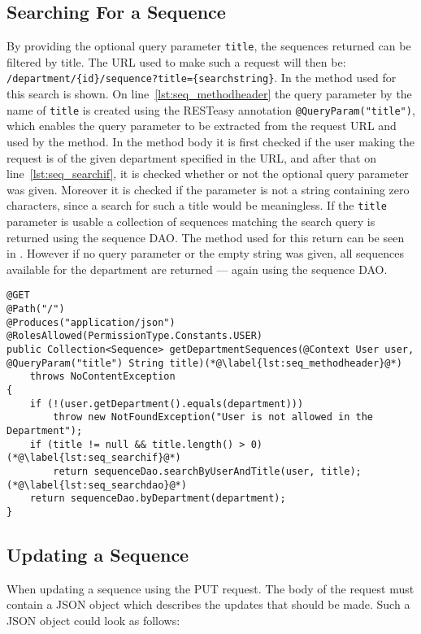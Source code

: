 \subsection{Searching For a Sequence}
By providing the optional query parameter \texttt{title}, the sequences returned can be filtered by title.
The URL used to make such a request will then be: \texttt{/department/\{id\}/sequence?title=\{searchstring\}}.
In  the method used for this search is shown.
On line~\ref{lst:seq_methodheader} the query parameter by the name of \texttt{title} is created using the RESTeasy annotation \texttt{@QueryParam("title")}, which enables the query parameter to be extracted from the request URL and used by the method.
In the method body it is first checked if the user making the request is of the given department specified in the URL, and after that on line~\ref{lst:seq_searchif}, it is checked whether or not the optional query parameter was given.
Moreover it is checked if the parameter is not a string containing zero characters, since a search for such a title would be meaningless.
If the \texttt{title} parameter is usable a collection of sequences matching the search query is returned using the sequence DAO.
The method used for this return can be seen in .
However if no query parameter or the empty string was given, all sequences available for the department are returned --- again using the sequence DAO.  

\begin{lstlisting}[float, floatplacement=h, caption={The method which returns a list of sequences; and it can be filtered using a query parameter.}, label={lst:seq_serviceget}]
@GET
@Path("/")
@Produces("application/json")
@RolesAllowed(PermissionType.Constants.USER)
public Collection<Sequence> getDepartmentSequences(@Context User user, @QueryParam("title") String title)(*@\label{lst:seq_methodheader}@*)
    throws NoContentException
{
    if (!(user.getDepartment().equals(department)))
        throw new NotFoundException("User is not allowed in the Department");
    if (title != null && title.length() > 0)(*@\label{lst:seq_searchif}@*)
        return sequenceDao.searchByUserAndTitle(user, title);(*@\label{lst:seq_searchdao}@*)
    return sequenceDao.byDepartment(department);
}	
\end{lstlisting}

\subsection{Updating a Sequence}
When updating a sequence using the PUT request.
The body of the request must contain a JSON object which describes the updates that should be made.
Such a JSON object could look as follows:

